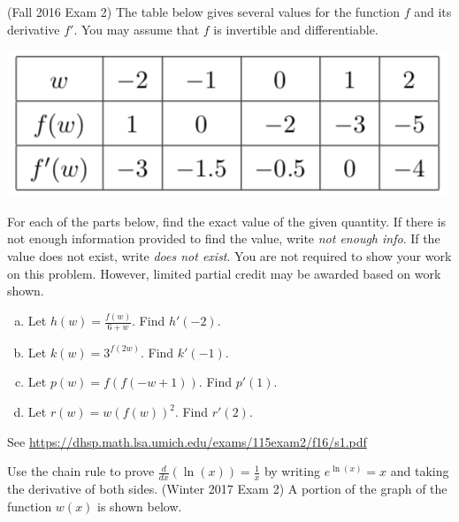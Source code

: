 \documentclass[11pt]{exam}
\begin{document}
\begin{questions}
\question (Fall 2016 Exam 2) %
The table below gives several values for the function $f$ and its derivative $f'$. You may assume that $f$ is invertible and differentiable.
\begin{center}
  \includegraphics[scale=0.4]{table2.png}
\end{center}
	For each of the parts below, find the exact value of the given quantity. If there is not enough information provided to find the value, write \emph{not enough info}. If the value does not exist, write \emph{does not exist}. You are not required to show your work on this problem. However, limited partial credit may be awarded based on work shown.
	\begin{multicols}{2}
	\begin{enumerate}[(a)]
	\item Let $h(w) = \frac{f(w)}{6+w}$. Find $h'(-2)$.
	\item Let $k(w) = 3^{f(2w)}$. Find $k'(-1)$.
	\item Let $p(w) = f(f(-w+1))$. Find $p'(1)$.
	\item Let $r(w) = w (f(w))^2$. Find $r'(2)$.
	\end{enumerate}
	\end{multicols}
        \begin{solution}
          See \href{https://dhsp.math.lsa.umich.edu/exams/115exam2/f16/s1.pdf}{https://dhsp.math.lsa.umich.edu/exams/115exam2/f16/s1.pdf}
        \end{solution}
\question Use the chain rule to prove \(\frac{d}{dx}(\ln(x)) =
  \frac{1}{x}\) by writing \(e^{\ln(x)} = x\) and taking the
  derivative of both sides.
\question (Winter 2017 Exam 2) %
  A portion of the graph of the function $w(x)$ is shown below.
  \begin{center}

\end{center}
\end{questions}
\end{document}
